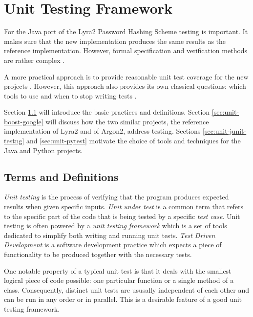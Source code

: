 \chapter{Unit Testing Framework}
\label{chapter:unit-testing-framework}

For the Java port of the Lyra2 Password Hashing Scheme testing is important. It makes sure that the new implementation produces the same results as the reference implementation. However, formal specification and verification methods are rather complex \cite{lamsweerde:2000:formal-specification, mueller:1994:formal-specification}.

A more practical approach is to provide reasonable unit test coverage for the new projects \cite{williams:2010:unit-tests-rock}. However, this approach also provides its own classical questions: which tools to use \cite{daka:2014:unit-testing-tools} and when to stop writing tests \cite{elberzhager:2012:reducing-effort}.

Section \ref{sec:unit-terms-and-definitions} will introduce the basic practices and definitions. Section \ref{sec:unit-boost-google} will discuss how the two similar projects, the reference implementation of Lyra2 and of Argon2, address testing. Sections \ref{sec:unit-junit-testng} and \ref{sec:unit-pytest} motivate the choice of tools and techniques for the Java and Python projects.

\section{Terms and Definitions}
\label{sec:unit-terms-and-definitions}

\emph{Unit testing} is the process of verifying that the program produces expected results when given specific inputs. \emph{Unit under test} is a common term that refers to the specific part of the code that is being tested by a specific \emph{test case}. Unit testing is often powered by a \emph{unit testing framework} which is a set of tools dedicated to simplify both writing and running unit tests. \emph{Test Driven Development} is a software development practice which expects a piece of functionality to be produced together with the necessary tests.

One notable property of a typical unit test is that it deals with the smallest logical piece of code possible: one particular function or a single method of a class. Consequently, distinct unit tests are ususally independent of each other and can be run in any order or in parallel. This is a desirable feature of a good unit testing framework.

